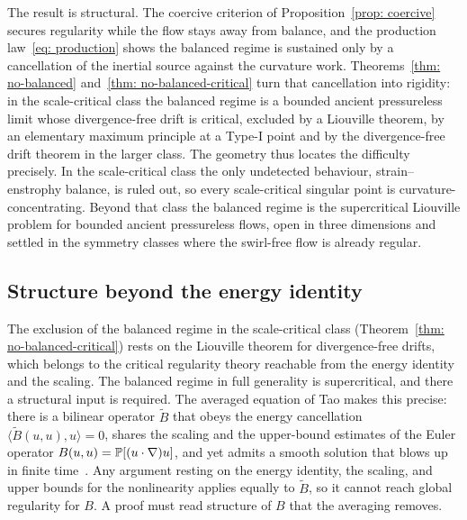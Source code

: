 The result is structural. The coercive criterion of
Proposition~\ref{prop: coercive} secures regularity while the flow stays away from
balance, and the production law~\eqref{eq: production} shows the balanced regime is
sustained only by a cancellation of the inertial source against the curvature work.
Theorems~\ref{thm: no-balanced} and~\ref{thm: no-balanced-critical} turn that
cancellation into rigidity: in the scale-critical class the balanced regime is a
bounded ancient pressureless limit whose divergence-free drift is critical, excluded
by a Liouville theorem, by an elementary maximum principle at a Type-I point and by
the divergence-free drift theorem in the larger class. The geometry thus locates the
difficulty precisely. In the scale-critical class the only undetected behaviour,
strain--enstrophy balance, is ruled out, so every scale-critical singular point is
curvature-concentrating. Beyond that class the balanced regime is the supercritical
Liouville problem for bounded ancient pressureless flows, open in three dimensions
and settled in the symmetry classes where the swirl-free flow is already regular.

\subsection{Structure beyond the energy identity}
\label{sec: barrier}

The exclusion of the balanced regime in the scale-critical class
(Theorem~\ref{thm: no-balanced-critical}) rests on the Liouville theorem for
divergence-free drifts, which belongs to the critical regularity theory reachable
from the energy identity and the scaling. The balanced regime in full generality is
supercritical, and there a structural input is required. The averaged equation of
Tao makes this precise: there is a bilinear operator $\tilde B$ that obeys the
energy cancellation $\langle\tilde B(u,u),u\rangle = 0$, shares the scaling and the
upper-bound estimates of the Euler operator $B(u,u) = \mathbb{P}[(u\cdot\nabla)u]$, and
yet admits a smooth solution that blows up in finite
time~\cite{tao-2016-fin-tim-blo}. Any argument resting on the energy identity, the
scaling, and upper bounds for the nonlinearity applies equally to $\tilde B$, so it
cannot reach global regularity for $B$. A proof must read structure of $B$ that the
averaging removes.

